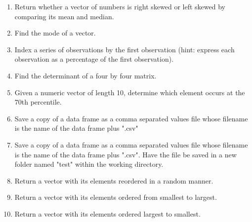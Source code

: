 \documentclass{article}
\begin{document}
\begin{enumerate}
\item Return whether a vector of numbers is right skewed or left skewed by comparing its mean and median.
\item Find the mode of a vector.
\item Index a series of observations by the first observation (hint: express each observation as a percentage of the first observation).
\item Find the determinant of a four by four matrix.
\item Given a numeric vector of length 10, determine which element occurs at the 70th percentile.
\item Save a copy of a data frame as a comma separated values file whose filename is the name of the data frame plus ".csv"
\item Save a copy of a data frame as a comma separated values file whose filename is the name of the data frame plus ".csv". Have the file be saved in a new folder named "test" within the working directory.
\item Return a vector with its elements reordered in a random manner.
\item Return a vector with its elements ordered from smallest to largest.
\item Return a vector with its elements ordered largest to smallest.





\end{enumerate}
\end{document}
